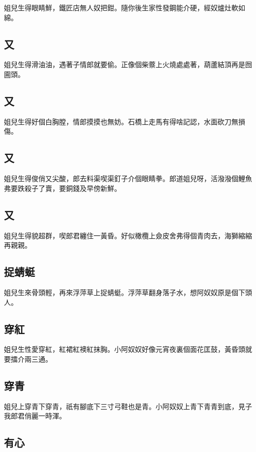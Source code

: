 姐兒生得眼睛鮮，鐵匠店無人奴把鉗。隨你後生家性發鋼能介硬，經奴爐灶軟如綿。

\subsection*{又}

姐兒生得滑油油，遇著子情郎就要偷。正像個柴䕓上火燒處處著，葫蘆結頂再是囫圇頭。

\subsection*{又}

姐兒生得好個白胸膛，情郎摸摸也無妨。石橋上走馬有得啥記認，水面砍刀無損傷。

\subsection*{又}

姐兒生得俊俏又尖酸，郎去料渠喫渠釘子介個眼睛拳。郎道姐兒呀，活潑潑個鯉魚弗要跌殺子了賣，要銅錢及早傍新鮮。

\subsection*{又}

姐兒生得貌超群，喫郎君纏住一黃昏。好似橄欖上僉皮舍弗得個青肉去，海獅縮縮再親親。

\subsection*{捉蜻蜓}

姐兒生來骨頭輕，再來浮萍草上捉蜻蜓。浮萍草翻身落子水，想阿奴奴原是個下頭人。

\subsection*{穿紅}

姐兒生性愛穿紅，紅裙紅襖紅抹胸。小阿奴奴好像元宵夜裏個面花匡鼓，黃昏頭就要擂介兩三通。

\subsection*{穿青}

姐兒上穿青下穿青，祇有腳底下三寸弓鞋也是青。小阿奴奴上青下青青到底，見子我郎君俏麗一時渾。

\subsection*{有心}

